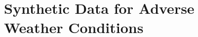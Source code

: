 \documentclass[report.tex]{subfiles}
\begin{document}

    
    \section{Synthetic Data for Adverse Weather Conditions}
\end{document}

